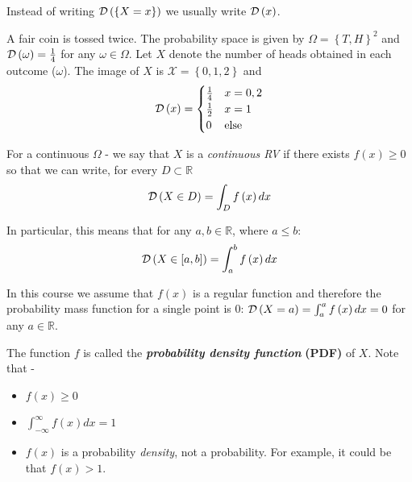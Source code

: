 Instead of writing $\mathcal{D}\left(\left\{ X=x\right\} \right)$ we usually
write $\mathcal{D}\left(x\right)$.

\begin{example}
A fair coin is tossed twice. The probability space is given by $\Omega=\left\{ T,H\right\} ^{2}$
and  $\mathcal{D}\left(\omega\right)=\frac{1}{4}$ for any $\omega\in \Omega$. Let $X$ denote the number of heads obtained in each outcome ($\omega$). The image of $X$ is  $\mathcal{X}=\left\{ 0,1,2\right\} $
and
\[
\mathcal{D}\left(x\right)=\begin{cases}
\frac{1}{4} & x=0,2\\
\frac{1}{2} & x=1\\
0 & \mbox{else}
\end{cases}
\]

\end{example}


For a continuous $\Omega$ - we say that $X$ is a \textit{continuous
RV} if there exists $f(x)\ge 0$ so that we can write, for every $D\subset\mathbb{R}$
\[
\mathcal{D}\left(X\in D\right)=\int_{D}f\left(x\right)dx
\]


In particular, this means that for any $a,b\in \mathbb{R}$, where $a\leq b$:
\[
\mathcal{D}\left(X\in\left[a,b\right]\right)=\int_{a}^{b}f\left(x\right)dx
\]

In this course we assume that $f(x)$ is a regular function and therefore the probability mass function for a single point is 0: $\mathcal{D}\left(X=a\right)=\int_{a}^{a}f\left(x\right)dx=0$ for any $a\in\mathbb{R}$.

The function $f$ is called the \textbf{\textit{probability density
function }}\textbf{(PDF)} of $X$. Note that -
\begin{itemize}
\item $f\left(x\right)\ge0$
\item $\int_{-\infty}^{\infty}f\left(x\right)dx=1$
\item $f\left(x\right)$ is a probability \emph{density}, not a probability. For example, it could be that $f\left(x\right)>1$.\\
\end{itemize}

